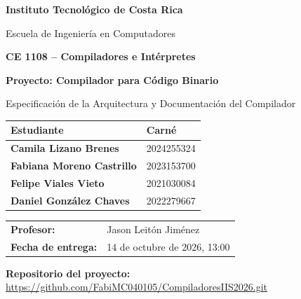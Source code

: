 \documentclass[11pt,letterpaper]{article}
\newcommand{\Universidad}{Instituto Tecnológico de Costa Rica}
\newcommand{\Escuela}{Escuela de Ingeniería en Computadores}
\newcommand{\Curso}{CE 1108 -- Compiladores e Intérpretes}
\newcommand{\TituloProyecto}{Proyecto: Compilador para Código Binario}
\newcommand{\Profesor}{Jason Leitón Jiménez}
\newcommand{\FechaEntrega}{14 de octubre de 2026, 13:00}
\newcommand{\Repositorio}{https://github.com/FabiMC040105/CompiladoresIIS2026.git}
\newcommand{\EstudianteUno}{Camila Lizano Brenes}
\newcommand{\CarneUno}{2024255324}
\newcommand{\EstudianteDos}{Fabiana Moreno Castrillo}
\newcommand{\CarneDos}{2023153700}
\newcommand{\EstudianteTres}{Felipe Viales Vieto}
\newcommand{\CarneTres}{2021030084}
\newcommand{\EstudianteCuatro}{Daniel González Chaves}
\newcommand{\CarneCuatro}{2022279667}
\begin{document}
\begin{titlepage}
    \thispagestyle{empty}
    \centering
    \vspace*{1.0cm}

    {\Large\bfseries \Universidad\par}
    \vspace{0.15cm}
    {\large \Escuela\par}

    \vspace{1.4cm}

    {\Large\bfseries \Curso\par}
    \vspace{0.7cm}
    {\LARGE\bfseries \TituloProyecto\par}
    \vspace{0.35cm}
    {\large Especificación de la Arquitectura y Documentación del Compilador\par}

    \vspace{1.25cm}

    \renewcommand{\arraystretch}{1.25}
    \begin{tabular}{>{\bfseries}p{8.0cm}p{3.0cm}}
        Estudiante & Carné \\
        \midrule
        \EstudianteUno & \CarneUno \\
        \EstudianteDos & \CarneDos \\
        \EstudianteTres & \CarneTres \\
        \EstudianteCuatro & \CarneCuatro \\
    \end{tabular}

    \vfill

    \begin{tabular}{>{\bfseries}ll}
        Profesor: & \Profesor \\
        Fecha de entrega: & \FechaEntrega \\
    \end{tabular}

    \vspace{0.45cm}

    {\small\textbf{Repositorio del proyecto:} \url{\Repositorio}\par}

    \vspace{0.8cm}
\end{titlepage}
\end{document}
